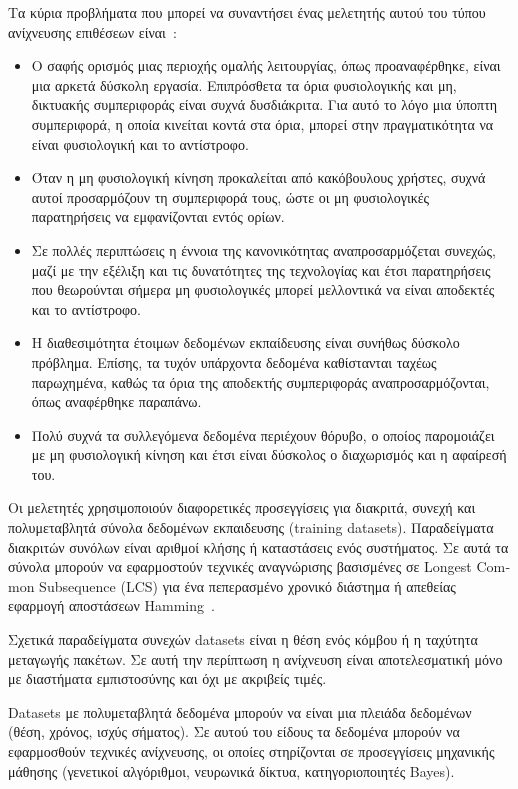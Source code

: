 \documentclass[12pt]{report}
\begin{document}
Τα κύρια προβλήματα που μπορεί να συναντήσει ένας μελετητής αυτού του τύπου ανίχνευσης επιθέσεων είναι~\cite{paper:14}:
\begin{itemize}
  \item Ο σαφής ορισμός μιας περιοχής ομαλής λειτουργίας, όπως προαναφέρθηκε, είναι μια αρκετά δύσκολη εργασία. Επιπρόσθετα τα όρια φυσιολογικής και μη, δικτυακής συμπεριφοράς είναι συχνά δυσδιάκριτα. Για αυτό το λόγο μια ύποπτη συμπεριφορά, η οποία κινείται κοντά στα όρια, μπορεί στην πραγματικότητα να είναι φυσιολογική και το αντίστροφο.
  \item Όταν η μη φυσιολογική κίνηση προκαλείται από κακόβουλους χρήστες, συχνά αυτοί προσαρμόζουν τη συμπεριφορά τους, ώστε οι μη φυσιολογικές παρατηρήσεις να εμφανίζονται εντός ορίων.
  \item Σε πολλές περιπτώσεις η έννοια της κανονικότητας αναπροσαρμόζεται συνεχώς, μαζί με την εξέλιξη και τις δυνατότητες της τεχνολογίας και έτσι παρατηρήσεις που θεωρούνται σήμερα μη φυσιολογικές μπορεί μελλοντικά να είναι αποδεκτές και το αντίστροφο.
  \item Η διαθεσιμότητα έτοιμων δεδομένων εκπαίδευσης είναι συνήθως δύσκολο πρόβλημα. Επίσης, τα τυχόν υπάρχοντα δεδομένα καθίστανται ταχέως παρωχημένα, καθώς τα όρια της αποδεκτής συμπεριφοράς αναπροσαρμόζονται, όπως αναφέρθηκε παραπάνω.
  \item Πολύ συχνά τα συλλεγόμενα δεδομένα περιέχουν θόρυβο, ο οποίος παρομοιάζει με μη φυσιολογική κίνηση και έτσι είναι δύσκολος ο διαχωρισμός και η αφαίρεσή του.
\end{itemize}

Οι μελετητές χρησιμοποιούν διαφορετικές προσεγγίσεις για διακριτά, συνεχή και πολυμεταβλητά σύνολα δεδομένων εκπαιδευσης (\textlatin{training datasets}). Παραδείγματα διακριτών συνόλων είναι αριθμοί κλήσης ή καταστάσεις ενός συστήματος. Σε αυτά τα σύνολα μπορούν να εφαρμοστούν τεχνικές αναγνώρισης βασισμένες σε \textlatin{Longest Common Subsequence (LCS)} για ένα πεπερασμένο χρονικό διάστημα ή απεθείας εφαρμογή αποστάσεων \textlatin{Hamming}~\cite{paper:12}.

Σχετικά παραδείγματα συνεχών \textlatin{datasets} είναι η θέση ενός κόμβου ή η ταχύτητα μεταγωγής πακέτων. Σε αυτή την περίπτωση η ανίχνευση είναι αποτελεσματική μόνο με διαστήματα εμπιστοσύνης και όχι με ακριβείς τιμές.

\textlatin{Datasets} με πολυμεταβλητά δεδομένα μπορούν να είναι μια πλειάδα δεδομένων (θέση, χρόνος, ισχύς σήματος). Σε αυτού του είδους τα δεδομένα μπορούν να εφαρμοσθούν τεχνικές ανίχνευσης, οι οποίες στηρίζονται σε προσεγγίσεις μηχανικής μάθησης (γενετικοί αλγόριθμοι, νευρωνικά δίκτυα, κατηγοριοποιητές \textlatin{Bayes}). 
\end{document}
